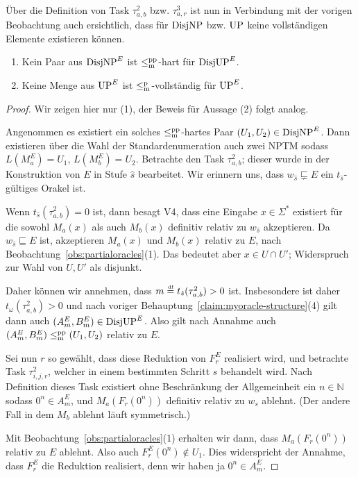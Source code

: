 Über die Definition von Task $\tau^2_{a,b}$ bzw. $\tau^3_{a,r}$ ist nun in Verbindung mit der vorigen Beobachtung auch ersichtlich, dass für $\mathrm{DisjNP}$ bzw. $\mathrm{UP}$ keine vollständigen Elemente existieren können.

\begin{claim}\label{claim:myoracle-completness}
    \begin{enumerate}
        \item Kein Paar aus $\mathrm{DisjNP}^E$ ist $\leq_\mathrm{m}^\mathrm{pp}$-hart für $\mathrm{DisjUP}^E$.
        \item Keine Menge aus $\mathrm{UP}^E$ ist $\leq_\mathrm{m}^\mathrm{p}$-vollständig für $\mathrm{UP}^E$.
    \end{enumerate}
\end{claim}
\begin{proof}
    Wir zeigen hier nur (1), der Beweis für Aussage (2) folgt analog.

    Angenommen es existiert ein solches $\leq_\mathrm{m}^\mathrm{pp}$-hartes Paar $(U_1, U_2)\in\mathrm{DisjNP}^E$.
    Dann existieren über die Wahl der Standardenumeration auch zwei NPTM sodass $L(M_a^E)=U_1$, $L(M_b^E)=U_2$.
    Betrachte den Task $\tau^2_{a,b}$; dieser wurde in der Konstruktion von $E$ in Stufe $\hat{s}$ bearbeitet.
    Wir erinnern uns, dass $w_{\hat{s}}\sqsubsetneq E$ ein $t_{\hat{s}}$-gültiges Orakel ist.

    Wenn $t_{\hat{s}}(\tau^2_{a,b})=0$ ist, dann besagt V4, dass eine Eingabe $x\in\Sigma^*$ existiert für die sowohl $M_a(x)$ als auch $M_b(x)$ definitiv relativ zu $w_{\hat{s}}$ akzeptieren. Da $w_{\hat{s}}\sqsubseteq E$ ist, akzeptieren $M_a(x)$ und $M_b(x)$ relativ zu $E$, nach Beobachtung~\ref{obs:partialoracles}(1).
    Das bedeutet aber $x\in U\cap U'$; Widerspruch zur Wahl von $U, U'$ als disjunkt.

    Daher können wir annehmen, dass $m\stackrel{\text{\smash{\tiny df}}}{=}  t_{\hat{s}}(\tau^2_{a,b})>0$ ist.
    Insbesondere ist daher $t_\omega(\tau^2_{a,b})>0$ und nach voriger Behauptung~\ref{claim:myoracle-structure}(4) gilt dann auch $(A^E_m, B^E_m)\in\mathrm{DisjUP}^E$. Also gilt nach Annahme auch $(A^E_m, B^E_m) \leq_\mathrm{m}^\mathrm{pp} (U_1, U_2)$ relativ zu $E$.
    
    Sei nun $r$ so gewählt, dass diese Reduktion von $F^E_r$ realisiert wird, und betrachte Task  $\tau^2_{i,j,r}$, welcher in einem bestimmten Schritt $s$ behandelt wird.
    Nach Definition dieses Task existiert ohne Beschränkung der Allgemeinheit ein $n\in\mathbb N$ sodass $0^n\in A_m^E$, und $M_a(F_r(0^n))$ definitiv relativ zu $w_s$ ablehnt. (Der andere Fall in dem $M_b$ ablehnt läuft symmetrisch.)

    Mit Beobachtung~\ref{obs:partialoracles}(1) erhalten wir dann, dass $M_a(F_r(0^n))$ relativ zu $E$ ablehnt. Also auch $F^E_r(0^n)\not\in U_1$. Dies widerspricht der Annahme, dass $F_r^E$ die Reduktion realisiert, denn wir haben ja $0^n\in A_m^E$.
\end{proof}

